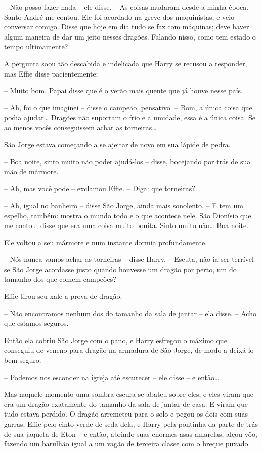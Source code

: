 -- Não posso fazer nada -- ele disse. -- As coisas mudaram desde a minha
época. Santo André me contou. Ele foi acordado na greve dos
maquinistas, e veio conversar comigo. Disse que hoje em dia tudo se
faz com máquinas; deve haver algum maneira de dar um jeito nesses
dragões. Falando nisso, como tem estado o tempo ultimamente?

A pergunta soou tão descabida e indelicada que Harry se recusou a
responder, mas Effie disse pacientemente:

-- Muito bom. Papai disse que é o verão mais quente que já houve nesse
país.

-- Ah, foi o que imaginei -- disse o campeão, pensativo. -- Bom, a única
coisa que podia ajudar… Dragões não suportam o frio e a umidade, essa
é a única coisa. Se ao menos vocês conseguissem achar as torneiras…

São Jorge estava começando a se ajeitar de novo em sua lápide de
pedra.

-- Boa noite, sinto muito não poder ajudá-los -- disse, bocejando por
trás de sua mão de mármore.

-- Ah, mas você pode -- exclamou Effie. -- Diga: que torneiras?

-- Ah, igual no banheiro -- disse São Jorge, ainda mais sonolento. -- E
tem um espelho, também: mostra o mundo todo e o que acontece nele.
São Dionísio que me contou; disse que era uma coisa muito bonita.
Sinto muito não… Boa noite.

Ele voltou a seu mármore e num instante dormia profundamente.

-- Nós nunca vamos achar as torneiras -- disse Harry. -- Escuta, não ia
ser terrível se São Jorge acordasse justo quando houvesse um dragão
por perto, um do tamanho dos que comem campeões?

Effie tirou seu xale a prova de dragão.

-- Não encontramos nenhum dos do tamanho da sala de jantar -- ela disse.
-- Acho que estamos seguros.

Então ela cobriu São Jorge com o pano, e Harry esfregou o máximo que
conseguiu de veneno para dragão na armadura de São Jorge, de modo a
deixá-lo bem seguro.

-- Podemos nos esconder na igreja até escurecer -- ele disse -- e então…

Mas naquele momento uma sombra escura se abateu sobre eles, e eles
viram que era um dragão exatamente do tamanho da sala de jantar de
casa. E viram que tudo estava perdido. O dragão arremeteu para o solo
e pegou os dois com suas garras, Effie pelo cinto verde de seda dela,
e Harry pela pontinha da parte de trás de sua jaqueta de Eton -- e
então, abrindo suas enormes asas amarelas, alçou vôo, fazendo um
barulhão igual a um vagão de terceira classe com o breque puxado.

